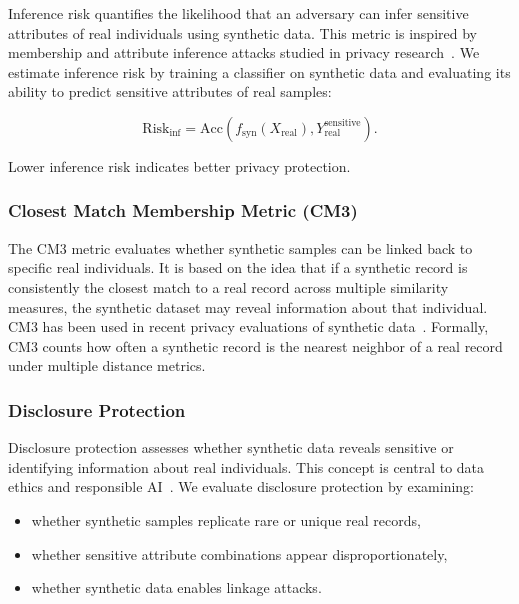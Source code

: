\documentclass[11pt]{article}
\begin{document}
Inference risk quantifies the likelihood that an adversary can infer sensitive attributes of real individuals using synthetic data. This metric is inspired by membership and attribute inference attacks studied in privacy research~\cite{stadler2022synthetic}. We estimate inference risk by training a classifier on synthetic data and evaluating its ability to predict sensitive attributes of real samples:

\begin{equation}
\text{Risk}_{\text{inf}} = 
\text{Acc}\left(f_{\text{syn}}(X_{\text{real}}), 
Y_{\text{real}}^{\text{sensitive}}\right).
\end{equation}

Lower inference risk indicates better privacy protection.

\subsubsection{Closest Match Membership Metric (CM3)}

The CM3 metric evaluates whether synthetic samples can be linked back to specific real individuals. It is based on the idea that if a synthetic record is consistently the closest match to a real record across multiple similarity measures, the synthetic dataset may reveal information about that individual. CM3 has been used in recent privacy evaluations of synthetic data~\cite{stadler2022synthetic}. Formally, CM3 counts how often a synthetic record is the nearest neighbor of a real record under multiple distance metrics.

\subsubsection{Disclosure Protection}

Disclosure protection assesses whether synthetic data reveals sensitive or identifying information about real individuals. This concept is central to data ethics and responsible AI~\cite{leslie2020ethics, floridi2016data}. We evaluate disclosure protection by examining:

\begin{itemize}
    \item whether synthetic samples replicate rare or unique real records,
    \item whether sensitive attribute combinations appear disproportionately,
    \item whether synthetic data enables linkage attacks.
\end{itemize}
\end{document}
